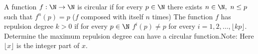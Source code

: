 A function $f: \N\rightarrow\N$ is circular if for every $p\in\N$ there exists $n\in\N,\ n\leq{p}$ such that $f^n(p)=p$ ($f$ composed with itself $n$ times) The function $f$ has repulsion degree $k>0$ if for every $p\in\N$ $f^i(p)\neq{p}$ for every $i=1,2,\dots,\lfloor{kp}\rfloor$. Determine the maximum repulsion degree can have a circular function.Note: Here $\lfloor{x}\rfloor$ is the integer part of $x$.